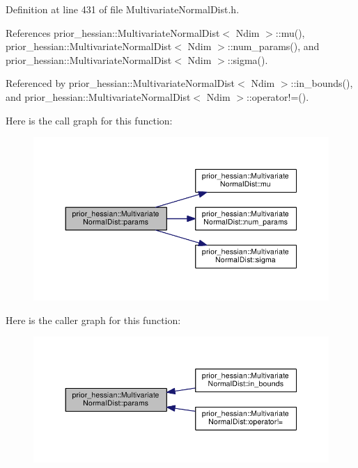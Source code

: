 Definition at line 431 of file Multivariate\+Normal\+Dist.\+h.



References prior\+\_\+hessian\+::\+Multivariate\+Normal\+Dist$<$ Ndim $>$\+::mu(), prior\+\_\+hessian\+::\+Multivariate\+Normal\+Dist$<$ Ndim $>$\+::num\+\_\+params(), and prior\+\_\+hessian\+::\+Multivariate\+Normal\+Dist$<$ Ndim $>$\+::sigma().



Referenced by prior\+\_\+hessian\+::\+Multivariate\+Normal\+Dist$<$ Ndim $>$\+::in\+\_\+bounds(), and prior\+\_\+hessian\+::\+Multivariate\+Normal\+Dist$<$ Ndim $>$\+::operator!=().



Here is the call graph for this function\+:\nopagebreak
\begin{figure}[H]
\begin{center}
\leavevmode
\includegraphics[width=350pt]{classprior__hessian_1_1MultivariateNormalDist_a55a53ff4ea86375a8971a5334c000c9c_cgraph}
\end{center}
\end{figure}




Here is the caller graph for this function\+:\nopagebreak
\begin{figure}[H]
\begin{center}
\leavevmode
\includegraphics[width=350pt]{classprior__hessian_1_1MultivariateNormalDist_a55a53ff4ea86375a8971a5334c000c9c_icgraph}
\end{center}
\end{figure}


